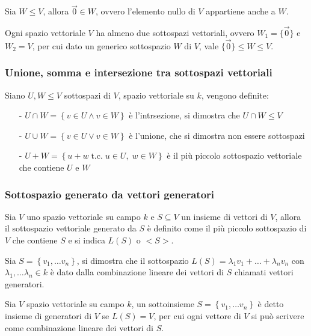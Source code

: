 \documentclass[a4paper]{article}
\begin{document}
Sia \(W \leq V\), allora \(\vec{0} \in W\), ovvero l'elemento nullo di \(V\) appartiene anche a \(W\).

Ogni spazio vettoriale \(V\) ha almeno due sottospazi vettoriali, ovvero \(W_1 = \{ \vec{0} \}\) e \(W_2 = V\), per cui
dato un generico sottospazio \(W\) di \(V\), vale \(\{ \vec{0} \} \leq W \leq V\).

\subsubsection*{Unione, somma e intersezione tra sottospazi vettoriali}
Siano \(U, W \leq V\) sottospazi di \(V\), spazio vettoriale su \(k\), vengono definite:
\begin{itemize}[topsep=3pt, itemsep=0pt]
	\item[-] \(U \cap W = \left\{ v \in U \land v \in W \right\}\) è l'intrsezione, si dimostra che \(U \cap W \leq V\)
	\item[-] \(U \cup W = \left\{ v \in U \lor v \in W \right\}\) è l'unione, che si dimostra non essere sottospazi
	\item[-] \(U + W = \left\{ u + w \; \text{t.c.} \; u \in U, \; w \in W\right\}\) è il più piccolo sottospazio vettoriale che
	contiene \(U\) e \(W\)
\end{itemize}

\subsubsection*{Sottospazio generato da vettori generatori}
Sia \(V\) uno spazio vettoriale su campo \(k\) e \(S \subseteq V\) un insieme di vettori di \(V\), allora il sottospazio vettoriale
generato da \(S\) è definito come il più piccolo sottospazio di \(V\) che contiene \(S\) e si indica \(L(S)\) o \(<S>\).

Sia \(S = \left\{ v_1, \dots v_n \right\}\), si dimostra che il sottospazio \(L(S) = \lambda_1 v_1 + \dots + \lambda_n v_n\) con
\(\lambda_1, \dots \lambda_n \in k\) è dato dalla combinazione lineare dei vettori di \(S\) chiamati vettori generatori.

Sia \(V\) spazio vettoriale su campo \(k\), un sottoinsieme \(S = \left\{ v_1, \dots v_n \right\}\) è detto insieme di generatori
di \(V\) se \(L(S) = V\), per cui ogni vettore di \(V\) si può scrivere come combinazione lineare dei vettori di \(S\).

\newpage
\end{document}
